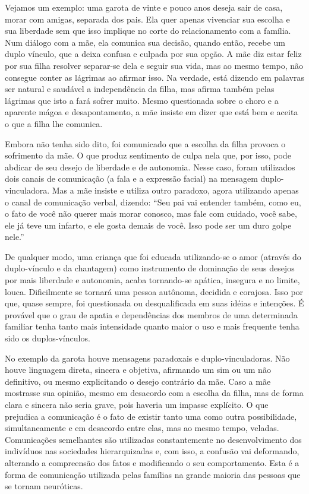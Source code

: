 Vejamos um exemplo: uma garota de vinte e pouco anos deseja sair de
casa, morar com amigas, separada dos pais. Ela quer apenas vivenciar sua
escolha e sua liberdade sem que isso implique no corte do relacionamento
com a família. Num diálogo com a mãe, ela comunica sua decisão, quando
então, recebe um duplo vínculo, que a deixa confusa e culpada por sua
opção. A mãe diz estar feliz por sua filha resolver separar-se dela e
seguir sua vida, mas ao mesmo tempo, não consegue conter as lágrimas ao
afirmar isso. Na verdade, está dizendo em palavras ser natural e
saudável a independência da filha, mas afirma também pelas lágrimas que
isto a fará sofrer muito. Mesmo questionada sobre o choro e a aparente
mágoa e desapontamento, a mãe insiste em dizer que está bem e aceita o
que a filha lhe comunica.

Embora não tenha sido dito, foi comunicado que a escolha da filha
provoca o sofrimento da mãe. O que produz sentimento de culpa nela que,
por isso, pode abdicar de seu desejo de liberdade e de autonomia. Nesse
caso, foram utilizados dois canais de comunicação (a fala e a expressão
facial) na mensagem duplo-vinculadora. Mas a mãe insiste e utiliza outro
paradoxo, agora utilizando apenas o canal de comunicação verbal,
dizendo: ``Seu pai vai entender também, como eu, o fato de você não
querer mais morar conosco, mas fale com cuidado, você sabe, ele já teve
um infarto, e ele gosta demais de você. Isso pode ser um duro golpe
nele.''

De qualquer modo, uma criança que foi educada utilizando-se o amor
(através do duplo-vínculo e da chantagem) como instrumento de dominação
de seus desejos por mais liberdade e autonomia, acaba tornando-se
apática, insegura e no limite, louca. Dificilmente se tornará uma pessoa
autônoma, decidida e corajosa. Isso por que, quase sempre, foi
questionada ou desqualificada em suas idéias e intenções. É provável que
o grau de apatia e dependências dos membros de uma determinada familiar
tenha tanto mais intensidade quanto maior o uso e mais frequente tenha
sido os duplos-vínculos.

No exemplo da garota houve mensagens paradoxais e duplo-vinculadoras.
Não houve linguagem direta, sincera e objetiva, afirmando um sim ou um
não definitivo, ou mesmo explicitando o desejo contrário da mãe. Caso a
mãe mostrasse sua opinião, mesmo em desacordo com a escolha da filha,
mas de forma clara e sincera não seria grave, pois haveria um impasse
explícito. O que prejudica a comunicação é o fato de existir tanto uma
como outra possibilidade, simultaneamente e em desacordo entre elas, mas
ao mesmo tempo, veladas. Comunicações semelhantes são utilizadas
constantemente no desenvolvimento dos indivíduos nas sociedades
hierarquizadas e, com isso, a confusão vai deformando, alterando a
compreensão dos fatos e modificando o seu comportamento. Esta é a forma
de comunicação utilizada pelas famílias na grande maioria das pessoas
que se tornam neuróticas.


